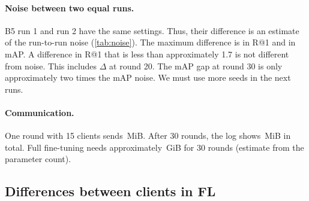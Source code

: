 \paragraph{Noise between two equal runs.} B5 run 1 and run 2 have the same settings. Thus, their difference is an estimate of the run-to-run noise (\cref{tab:noise}). The maximum difference is \numNoiseR\pp{} in R@1 and \numNoiseM\pp{} in mAP. A difference in R@1 that is less than approximately 1.7\pp{} is not different from noise. This includes $\Delta$ at round 20. The mAP gap at round 30 is only approximately two times the mAP noise. We must use more seeds in the next runs.

\begin{table}[t]
\centering\small
\caption{Two B5 runs with the same settings. The difference is a rough estimate of the run-to-run noise (two values at each round only).}\label{tab:noise}

\end{table}

\paragraph{Communication.} One round with 15 clients sends \numUplinkRoundLoRA\,MiB. After 30 rounds, the log shows \numUplinkRthirty\,MiB in total. Full fine-tuning needs approximately \numUplinkFullThirty\,GiB for 30 rounds (estimate from the parameter count).

\subsection{Differences between clients in FL}\label{sec:hetero}


